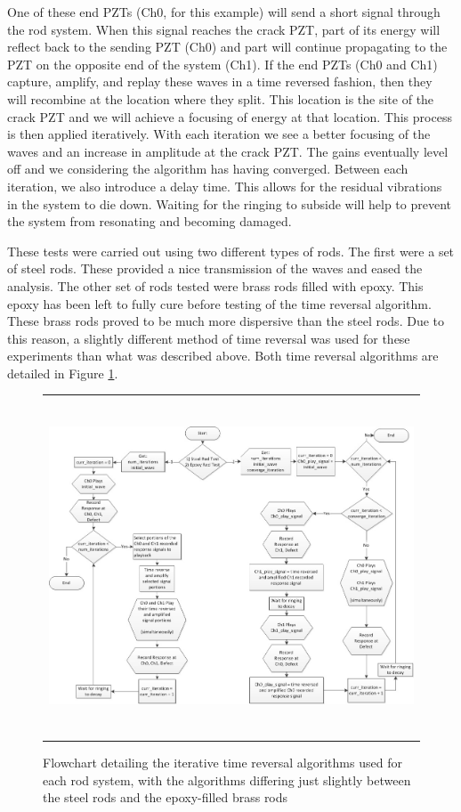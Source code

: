 \documentclass[a4paper]{spie}  %
\begin{document}
One of these end PZTs (Ch0, for this example) will send a short signal through the rod system. When this signal reaches the crack PZT, part of its energy will reflect back to the sending PZT (Ch0) and part will continue propagating to the PZT on the opposite end of the system (Ch1). If the end PZTs  (Ch0 and Ch1) capture, amplify, and replay these waves in a time reversed fashion, then they will recombine at the location where they split. This location is the site of the crack PZT and we will achieve a focusing of energy at that location. This process is then applied iteratively. With each iteration we see a better focusing of the waves and an increase in amplitude at the crack PZT. The gains eventually level off and we considering the algorithm has having converged. Between each iteration, we also introduce a delay time. This allows for the residual vibrations in the system to die down. Waiting for the ringing to subside will help to prevent the system from resonating and becoming damaged.

These tests were carried out using two different types of rods. The first were a set of steel rods. These provided a nice transmission of the waves and eased the analysis. The other set of rods tested were brass rods filled with epoxy. This epoxy has been left to fully cure before testing of the time reversal algorithm. These brass rods proved to be much more dispersive than the steel rods. Due to this reason, a slightly different method of time reversal was used for these experiments than what was described above. Both time reversal algorithms are detailed in Figure \ref{fig:flow_chart}.

\begin{figure}[h!]
\begin{center}
\begin{tabular}{c}
\includegraphics[height=10cm]{flow_chart}
\end{tabular}
\end{center}
\caption[example] 
   { \label{fig:flow_chart} 
   Flowchart detailing the iterative time reversal algorithms used for each rod system, with the algorithms differing just slightly between the steel rods and the epoxy-filled brass rods}
\end{figure} 
\end{document}

